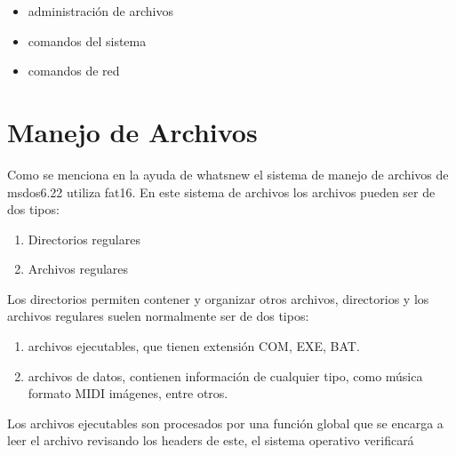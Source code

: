 \documentclass[paper=a4, fontsize=12pt]{article} 		%
\numberwithin{equation}{section}						%
\numberwithin{table}{section} 							%
\begin{document}
\begin{itemize}
\item administración de archivos
\item comandos del sistema 
\item comandos de red
\end{itemize}

\begin{figure}[H]
 	\centering
\end{figure}

\section{ Manejo de Archivos}
Como se menciona en la ayuda de whatsnew el sistema de manejo de archivos de msdos6.22 utiliza fat16. En este sistema de archivos los archivos pueden ser de dos tipos:
\begin{enumerate}
\item Directorios regulares
\item Archivos regulares 
\end{enumerate}
Los directorios permiten contener y organizar otros archivos, directorios y los archivos regulares suelen normalmente ser de dos tipos: 
\begin{enumerate}
\item archivos ejecutables, que tienen extensión COM, EXE, BAT. 
\item archivos de datos, contienen información de cualquier tipo, como música formato MIDI imágenes, entre otros.
\end{enumerate}
Los archivos ejecutables son procesados por una función global que se encarga a leer el archivo revisando los headers de este, el sistema operativo verificará 
\end{document}
